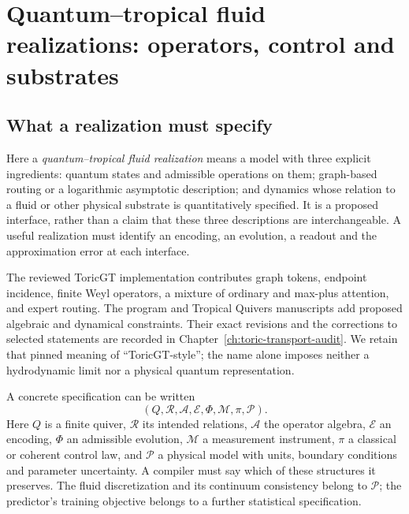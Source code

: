\chapter{Quantum--tropical fluid realizations: operators, control and substrates}
\label{ch:quantum-tropical-realizations}


\section{What a realization must specify}

Here a \emph{quantum--tropical fluid realization} means a model with three
explicit ingredients: quantum states and admissible operations on them;
graph-based routing or a logarithmic asymptotic description; and dynamics
whose relation to a fluid or other physical substrate is quantitatively
specified. It is a proposed interface, rather than a claim that these three
descriptions are interchangeable. A useful realization must identify an
encoding, an evolution, a readout and the approximation error at each
interface.

The reviewed ToricGT implementation contributes graph tokens, endpoint
incidence, finite Weyl operators, a mixture of ordinary and max-plus
attention, and expert routing. The program and Tropical Quivers manuscripts
add proposed algebraic and dynamical constraints. Their exact revisions and
the corrections to selected statements are recorded in
Chapter~\ref{ch:toric-transport-audit}. We retain that pinned meaning of
``ToricGT-style''; the name alone imposes neither a hydrodynamic limit nor a
physical quantum representation.\cite{qtToricGTCode,qtToricGTProgram,ToricAuditQuivers2026}

A concrete specification can be written
\[
 (Q,\mathcal R,\mathcal A,\mathcal E,\Phi,\mathcal M,\pi,\mathcal P).
\]
Here $Q$ is a finite quiver, $\mathcal R$ its intended relations,
$\mathcal A$ the operator algebra, $\mathcal E$ an encoding,
$\Phi$ an admissible evolution, $\mathcal M$ a measurement instrument,
$\pi$ a classical or coherent control law, and $\mathcal P$ a physical
model with units, boundary conditions and parameter uncertainty. A compiler
must say which of these structures it preserves. The fluid discretization
and its continuum consistency belong to $\mathcal P$; the predictor's
training objective belongs to a further statistical specification.

